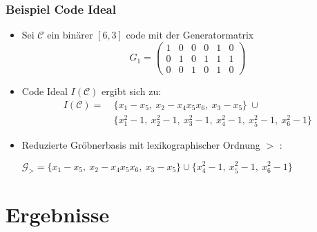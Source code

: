 \documentclass{beamer}
\begin{document}
\begin{frame}
\frametitle{Beispiel Code Ideal}
\begin{itemize}
\item 
Sei $\mathcal{C}$ ein binärer $[6,3]$ code mit der Generatormatrix
\[
G_{1} =
\begin{pmatrix}
1 & 0 & 0 & 0 & 1 & 0 \\ 
0 & 1 & 0 & 1 & 1 & 1 \\  
0 & 0 & 1 & 0 & 1 & 0  
\end{pmatrix} 
\]

\item Code Ideal $I(\mathcal{C})$ ergibt sich zu: 
\begin{align*}
I(\mathcal{C}) = &~\{x_{1}-x_{5},~x_{2}-x_{4}x_{5}x_{6},~x_{3}-x_{5}  \} ~\cup \\ &~\{x_{1}^{2}-1,~x_{2}^{2}-1,~x_{3}^{2}-1,~x_{4}^{2}-1,~x_{5}^{2}-1,~x_{6}^{2}-1\}
\end{align*}
\item Reduzierte Gröbnerbasis mit lexikographischer Ordnung $>$ :
\begin{center}
$ \mathcal{G}_{>} = \{x_{1}-x_{5},~x_{2}-x_{4}x_{5}x_{6},~x_{3}-x_{5}  \} \cup \{x_{4}^{2}-1,~x_{5}^{2}-1,~x_{6}^{2}-1  \}  $
\end{center} 

\end{itemize}
\end{frame}

\section{Ergebnisse}
\end{document}
